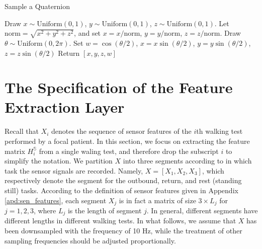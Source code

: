 \begin{appendices}
\begin{algorithm}[h]
\caption{Sample a Quaternion}\label{alg:sample_quaternion}
\begin{algorithmic}[1]
\State Draw $x \sim \text{Uniform}(0,1)$, $y \sim \text{Uniform}(0,1)$, $z \sim \text{Uniform}(0,1)$.
\State Let $\text{norm}=\sqrt{x^2+y^2+z^2}$, and set $x=x/\text{norm}$, $y=y/\text{norm}$, $z=z/\text{norm}$.
\State Draw $\theta \sim \text{Uniform}(0,2\pi)$.
\State Set $w=\cos(\theta/2)$, $x=x \sin(\theta/2)$, $y=y \sin(\theta/2)$, $z=z \sin(\theta/2)$
\State Return $[x,y,z,w]$
\end{algorithmic}
\end{algorithm}

\clearpage

\section{The Specification of the Feature Extraction Layer}\label{apd:cnn}

Recall that $X_i$ denotes the sequence of sensor features of the $i$th walking test performed by a focal patient. In this section, we focus on extracting the feature matrix $H_i^\mathbb{S}$ from a single waling test, and therefore drop the subscript $i$ to simplify the notation. 
We partition $X$ into three segments according to in which task the sensor signals are recorded. Namely, $X=[X_{1}, X_{2}, X_{3}]$, which respectively denote the segment for the outbound, return, and rest (standing still) tasks. According to the definition of sensor features given in Appendix \ref{apd:sen_features}, each segment $X_j$ is in fact a matrix of size $3 \times L_j$ for $j=1,2,3$, where $L_j$ is the length of segment $j$. In general, different segments have different lengths in different walking tests. In what follows, we assume that $X$ has been downsampled with the frequency of 10 Hz, while the treatment of other sampling frequencies should be adjusted proportionally.


\end{appendices}
